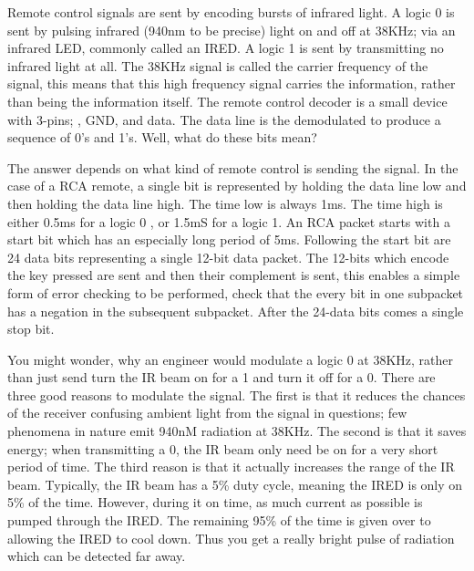 Remote control signals are sent by encoding bursts of infrared light.  A logic
0 is sent by pulsing infrared (940nm to be precise) light on and off at 38KHz;
via an infrared LED, commonly called an IRED.
A logic 1 is sent by transmitting no infrared light at all.  The 38KHz signal
is called the carrier frequency of the signal, this means that this high frequency
signal carries the information, rather than being the information itself.  The
remote control decoder is a small device with 3-pins; \VCC, GND, and data.  The
data line is the demodulated to produce a sequence of 0's and 1's.  Well, what do
these bits mean?

The answer depends on what kind of remote control is sending the signal.  In the
case of a RCA remote, a single bit is represented by holding the data line low and 
then holding the data line high.  The time low is always 1ms.  The time high is 
either 0.5ms for a logic 0 , or 1.5mS for a logic 1.  An RCA packet starts with
a start bit which has an especially long period of 5ms.  Following the start
bit are 24 data bits representing a single 12-bit data packet.  The 12-bits
which encode the key pressed are sent and then their complement is sent, this 
enables a simple form of error checking to be performed, check that the every
bit in one subpacket has a negation in the subsequent subpacket.  After the 24-data
bits comes a single stop bit.

You might wonder, why an engineer would modulate a logic 0 at 38KHz, rather than
just send turn the IR beam on for a 1 and turn it off for a 0.  There are three
good reasons to modulate the signal.  The first is that 
it reduces the chances of the receiver confusing ambient light from the
signal in questions; few phenomena in nature emit 940nM radiation at 38KHz. The 
second is that it saves energy; when transmitting a 0, the IR beam only need be
on for a very short period of time.  The third reason is that it actually 
increases the range of the IR beam.  Typically, the IR beam has a 5\% duty cycle,
meaning the IRED is only on 5\% of the time.  However, during it on time, 
as much current as possible is pumped through the IRED.  The remaining 95\% of
the time is given over to allowing the IRED to cool down.  Thus you get a really
bright pulse of radiation which can be detected far away.





